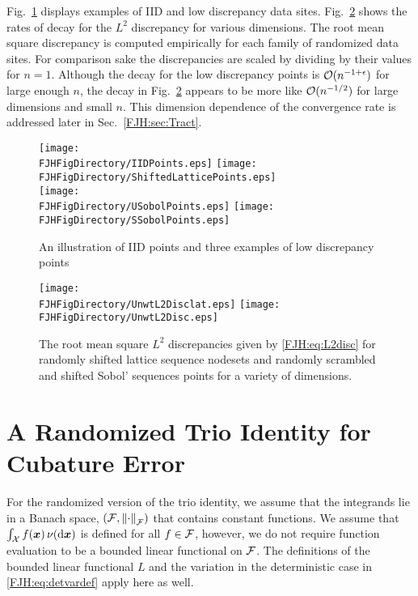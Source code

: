 \documentclass[graybox,footinfo]{svmult}
\begin{document}
Fig.\ \ref{FJH:fig:plotsdiffpts} displays examples of IID and low discrepancy data sites.  
Fig.\ \ref{FJH:fig:unwtdiscdiffpts} shows the rates of decay for the $L^2$ discrepancy for 
various dimensions.  The root mean square discrepancy is computed 
empirically for each family of randomized data sites.    For comparison sake the 
discrepancies are scaled by 
dividing by their values for $n=1$.  Although the 
decay for the low discrepancy points is 
${\mathcal{O}}(n^{-1+\epsilon})$ for large enough $n$, the decay in Fig.\ 
\ref{FJH:fig:unwtdiscdiffpts} appears to be 
more like ${\mathcal{O}}(n^{-1/2})$ for large dimensions and small $n$.   This dimension 
dependence of the convergence rate is addressed later in Sec.\  \ref{FJH:sec:Tract}. 


\begin{FJHLesson}
	\FJHLessonTwo
\end{FJHLesson}


\begin{figure}
	\centering
	\texttt{[image: \\FJHFigDirectory/IIDPoints.eps]} \qquad
	\texttt{[image: \\FJHFigDirectory/ShiftedLatticePoints.eps]} \\
	\texttt{[image: \\FJHFigDirectory/USobolPoints.eps]} \qquad
	\texttt{[image: \\FJHFigDirectory/SSobolPoints.eps]}
	\caption{An illustration of IID points and three examples of low discrepancy points 
	\label{FJH:fig:plotsdiffpts}}
\end{figure}

\begin{figure}
	\centering
	  \texttt{[image: \\FJHFigDirectory/UnwtL2Disclat.eps]}   
	  \qquad 
	  \texttt{[image: \\FJHFigDirectory/UnwtL2Disc.eps]} 
	\caption{The root mean square $L^2$ discrepancies given by \eqref{FJH:eq:L2disc} 
	for randomly shifted 
	lattice sequence nodesets and randomly scrambled and shifted Sobol' sequences 
	points for a variety of dimensions.
		\label{FJH:fig:unwtdiscdiffpts}}
\end{figure}

\section{A Randomized Trio Identity for Cubature Error} \label{FJH:sec:rndtrio}
For the randomized version of the trio identity, we assume that the integrands lie in 
a Banach space, $({\mathcal{F}},\left \lVert \cdot \right \rVert_{{\mathcal{F}}})$ that contains 
constant functions.  We assume
that $\int_{{\mathcal{X}}} f({\boldsymbol{x}}) \, \nu(\mathrm{d}{\boldsymbol{x}})$ is defined  for all $f \in {\mathcal{F}}$, however, we  
do not require 
function evaluation to be a bounded linear functional on ${\mathcal{F}}$.  The definitions of the 
bounded linear functional $L$ and the variation in the deterministic case in  
\eqref{FJH:eq:detvardef} apply here as well.
\end{document}
